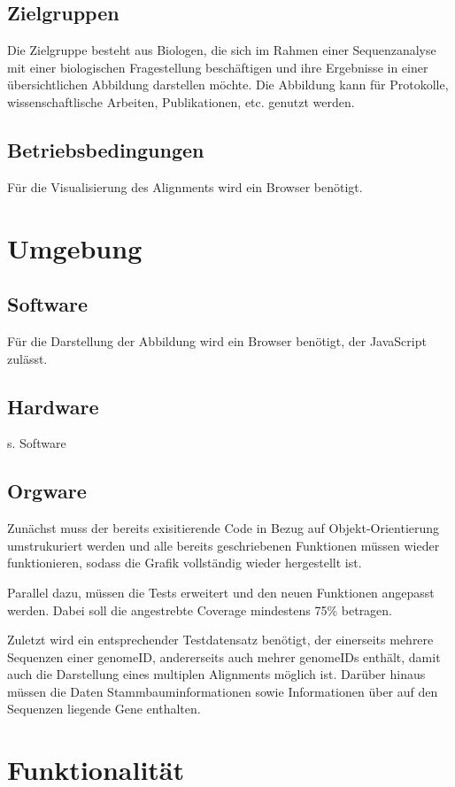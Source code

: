 \documentclass[a4paper]{scrreprt}
\begin{document}
\section{Zielgruppen}
Die Zielgruppe besteht aus Biologen, die sich im Rahmen einer Sequenzanalyse mit einer biologischen Fragestellung beschäftigen und ihre Ergebnisse in einer übersichtlichen Abbildung darstellen möchte. Die Abbildung kann für Protokolle, wissenschaftlische Arbeiten, Publikationen, etc. genutzt werden.

\section{Betriebsbedingungen}
Für die Visualisierung des Alignments wird ein Browser benötigt.

\chapter{Umgebung} 
\section{Software}
Für die Darstellung der Abbildung wird ein Browser benötigt, der JavaScript zulässt.
\section{Hardware}
s. Software
\section{Orgware}
Zunächst muss der bereits exisitierende Code in Bezug auf Objekt-Orientierung umstrukuriert werden und alle bereits geschriebenen Funktionen müssen wieder funktionieren, sodass die Grafik vollständig wieder hergestellt ist.

Parallel dazu, müssen die Tests erweitert und den neuen Funktionen angepasst werden. Dabei soll die angestrebte Coverage mindestens 75\% betragen. 

Zuletzt wird ein entsprechender Testdatensatz benötigt, der einerseits mehrere Sequenzen einer genomeID, andererseits auch mehrer genomeIDs enthält, damit auch die Darstellung eines multiplen Alignments möglich ist. Darüber hinaus müssen die Daten Stammbauminformationen sowie Informationen über auf den Sequenzen liegende Gene enthalten. 
\chapter{Funktionalität}
\end{document}
